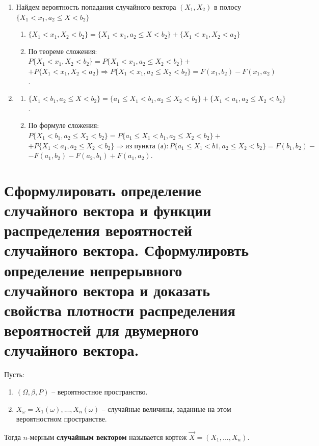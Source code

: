 \begin{enumerate}[label=(\alph*)]
	\item Найдем вероятность попадания случайного вектора $(X_1, X_2)$ в полосу $\{X_1 < x_1, a_2 \leq X < b_2\}$
	
	\begin{enumerate}[label=\arabic*.]
		\item $\{X_1 < x_1, X_2 < b_2\} = \{X_1 < x_1, a_2 \leq X < b_2\} + \{X_1 < x_1, X_2 < a_2\}$
		
		\item По теореме сложения: $P\{X_1 < x_1, X_2 < b_2\} = P\{X_1 < x_1, a_2 \leq X_2 < b_2 \} +$\newline$+P\{X_1 < x_1, X_2 < a_2\} \Rightarrow P\{X_1<x_1,a_2\leq X_2<b_2\} = F(x_1, b_2) - F(x_1, a_2)$.
	\end{enumerate}
	
	\item \begin{enumerate}[label=\arabic*.]
		\item $\{X_1 < b_1, a_2 
		\leq X <b_2\} = \{a_1 \leq X_1 < b_1, a_2 \leq X_2 < b_2\} + \{X_1 < a_1, a_2 \leq X_2 < b_2\}$.
		
		\item По формуле сложения: $P\{X_1 < b_1, a_2 \leq X_2 < b_2\} = P\{a_1 \leq X_1 < b_1, a_2 \leq X_2 < b_2\} +$ 
		\newline$+P\{X_1 < a_1, a_2 \leq X_2 < b_2\} \Rightarrow \text{из пункта (а)}: P\{a_1 \leq X_1 < b1, a_2 \leq X_2 < b_2\} =  F(b_1, b_2) -$ $-F(a_1, b_2)-F(a_2, b_1) + F(a_1, a_2)$.
	\end{enumerate}
	
\end{enumerate}



\section{Сформулировать определение случайного вектора и функции распределения вероятностей случайного вектора. Сформулировть определение непрерывного случайного вектора и доказать свойства плотности распределения вероятностей для двумерного случайного вектора.}

Пусть: 
\begin{enumerate}
	\item $(\Omega, \beta, P)$ -- вероятностное пространство.
	
	\item $X_{\omega} = X_1(\omega),...,X_n(\omega)$ -- случайные величины, заданные на этом вероятностном пространстве.
\end{enumerate}
Тогда $n$-мерным \textbf{случайным вектором} называется кортеж $\vec{X} = (X_1,..., X_n)$.

